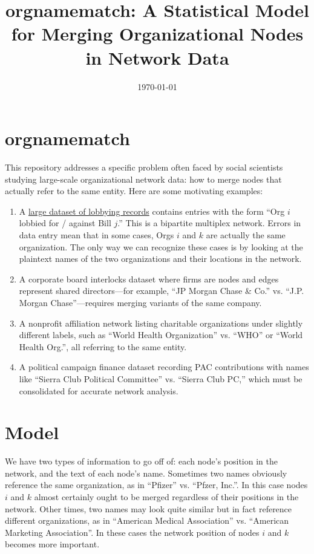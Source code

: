 \documentclass[12pt]{article}
\title{orgnamematch: A Statistical Model for Merging Organizational Nodes in Network Data}
\author{}
\date{\today}
\begin{document}
\maketitle

\section*{orgnamematch}
This repository addresses a specific problem often faced by social scientists studying large-scale organizational network data: how to merge nodes that actually refer to the same entity. Here are some motivating examples:

\begin{enumerate}
\item A \href{https://www.cambridge.org/core/journals/state-politics-and-policy-quarterly/article/chorus-a-new-dataset-of-state-interest-group-policy-positions-in-the-united-states/6827DC9EC72301016894F265777C0078}{large dataset of lobbying records} contains entries with the form ``Org $i$ lobbied for / against Bill $j$.'' This is a bipartite multiplex network. Errors in data entry mean that in some cases, Orgs $i$ and $k$ are actually the same organization. The only way we can recognize these cases is by looking at the plaintext names of the two organizations and their locations in the network.
\item A corporate board interlocks dataset where firms are nodes and edges represent shared directors---for example, ``JP Morgan Chase \& Co.'' vs. ``J.P. Morgan Chase''---requires merging variants of the same company.
\item A nonprofit affiliation network listing charitable organizations under slightly different labels, such as ``World Health Organization'' vs. ``WHO'' or ``World Health Org.'', all referring to the same entity.
\item A political campaign finance dataset recording PAC contributions with names like ``Sierra Club Political Committee'' vs. ``Sierra Club PC,'' which must be consolidated for accurate network analysis.
\end{enumerate}

\section{Model}
We have two types of information to go off of: each node's position in the network, and the text of each node's name. Sometimes two names obviously reference the same organization, as in ``Pfizer'' vs. ``Pfzer, Inc.''. In this case nodes $i$ and $k$ almost certainly ought to be merged regardless of their positions in the network. Other times, two names may look quite similar but in fact reference different organizations, as in ``American Medical Association'' vs. ``American Marketing Association''. In these cases the network position of nodes $i$ and $k$ becomes more important.
\end{document}
